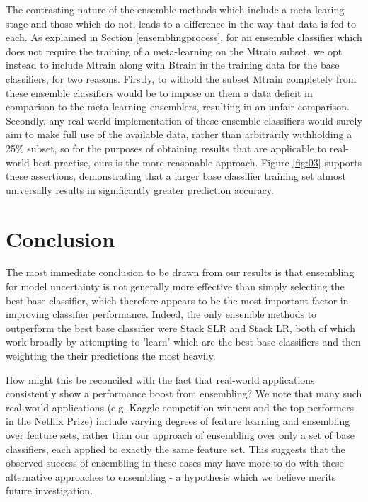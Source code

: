 \documentclass{bioinfo}
\begin{document}
\noindent
The contrasting nature of the ensemble methods which include a meta-learing stage and those which do not, leads to a difference in the way that data is fed to each. As explained in Section \ref{ensemblingprocess}, for an ensemble classifier which does not require the training of a meta-learning on the Mtrain subset, we opt instead to include Mtrain along with Btrain in the training data for the base classifiers, for two reasons. Firstly, to withold the subset Mtrain completely from these ensemble classifiers would be to impose on them a data deficit in comparison to the meta-learning ensemblers, resulting in an unfair comparison. Secondly, any real-world implementation of these ensemble classifiers would surely aim to make full use of the available data, rather than arbitrarily withholding a 25\% subset, so for the purposes of obtaining results that are applicable to real-world best practise, ours is the more reasonable approach. Figure \ref{fig:03} supports these assertions, demonstrating that a larger base classifier training set almost universally results in significantly greater prediction accuracy.


\vspace{-0.5cm}
\section{Conclusion}

The most immediate conclusion to be drawn from our results is that ensembling for model uncertainty is not generally more effective than simply selecting the best base classifier, which therefore appears to be the most important factor in improving classifier performance. Indeed, the only ensemble methods to outperform the best base classifier were Stack SLR and Stack LR, both of which work broadly by attempting to 'learn' which are the best base classifiers and then weighting the their predictions the most heavily.

How might this be reconciled with the fact that real-world applications consistently show a performance boost from ensembling? We note that many such real-world applications (e.g. Kaggle competition winners and the top performers in the Netflix Prize) include varying degrees of feature learning and ensembling over feature sets, rather than our approach of ensembling over only a set of base classifiers, each applied to exactly the same feature set. This suggests that the observed success of ensembling in these cases may have more to do with these alternative approaches to ensembling - a hypothesis which we believe merits future investigation.
\end{document}
